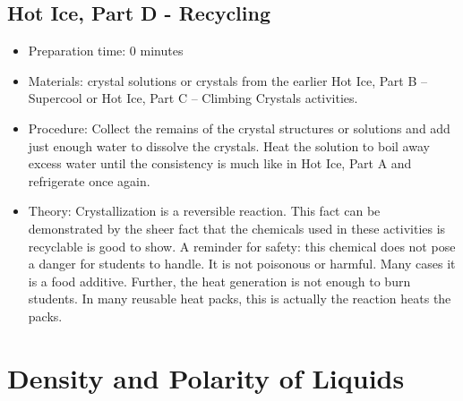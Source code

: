 \subsection{Hot Ice, Part D - Recycling}
\begin{itemize}
\item{Preparation time: 0 minutes}
\item{Materials: crystal solutions or crystals from the earlier Hot Ice, Part B – Supercool or Hot Ice, Part C – Climbing Crystals activities.}
\item{Procedure: Collect the remains of the crystal structures or solutions and add just enough water to dissolve the crystals. Heat the solution to boil away excess water until the consistency is much like in Hot Ice, Part A and refrigerate once again.}
\item{Theory: Crystallization is a reversible reaction. This fact can be demonstrated by the sheer fact that the chemicals used in these activities is recyclable is good to show. A reminder for safety: this chemical does not pose a danger for students to handle. It is not poisonous or harmful. Many cases it is a food additive. Further, the heat generation is not enough to burn students. In many reusable heat packs, this is actually the reaction heats the packs.}
\end{itemize}

\section{Density and Polarity of Liquids}

